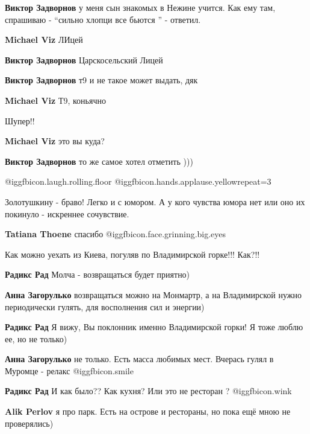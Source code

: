 \begin{itemize}
\begin{itemize}
\textbf{Виктор Задворнов} у меня сын знакомых в Нежине учится. Как ему там, спрашиваю - \enquote{сильно хлопци все бьются } - ответил.


\textbf{Michael Viz} ЛИцей

\textbf{Виктор Задворнов} Царскосельский Лицей

\textbf{Виктор Задворнов} т9 и не такое может выдать, дяк

\textbf{Michael Viz} Т9, коньячно

Шупер!!

\textbf{Michael Viz} это вы куда?

\textbf{Виктор Задворнов} то же самое хотел отметить )))

\end{itemize} %

 @igg{fbicon.laugh.rolling.floor}  @igg{fbicon.hands.applause.yellow}{repeat=3} 

Золотушкину - браво! Легко и с юмором. А у кого чувства юмора нет или оно их покинуло - искреннее сочувствие.

\textbf{Tatiana Thoene} спасибо @igg{fbicon.face.grinning.big.eyes} 

Как можно уехать из Киева, погуляв по Владимирской горке!!! Как?!!

\begin{itemize} %
\textbf{Радикс Рад} Молча - возвращаться будет приятно)

\textbf{Анна Загорулько} возвращаться можно на Монмартр, а на Владимирской нужно периодически гулять, для восполнения сил и энергии)

\textbf{Радикс Рад} Я вижу, Вы поклонник именно Владимирской горки! Я тоже люблю ее, но не только)

\textbf{Анна Загорулько} не только. Есть масса любимых мест. Вчерась гулял в Муромце - релакс  @igg{fbicon.smile} 

\textbf{Радикс Рад} И как было?? Как кухня? Или это не ресторан ? @igg{fbicon.wink} 

\textbf{Alik Perlov} я про парк. Есть на острове и рестораны, но пока ещё мною не проверялись)
\end{itemize} %


\end{itemize}
